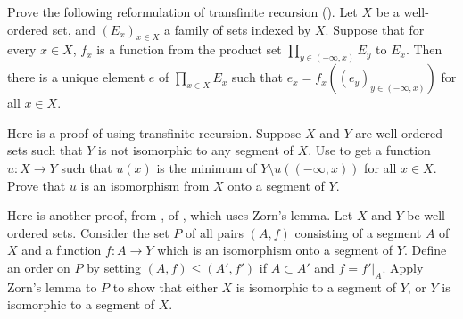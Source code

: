 \documentclass{article}
\begin{document}
\begin{exercise}
  \label{exe:oh59gz4i}
  Prove the following reformulation of transfinite recursion
  ().  Let \(X\) be a well-ordered set, and
  \((E_x)_{x \in X}\) a family of sets indexed by \(X\).  Suppose that
  for every \(x \in X\), \(f_x\) is a function from the product set
  \(\prod_{y \in (-\infty, x)} E_y\) to \(E_x\).  Then there is a
  unique element \(e\) of \(\prod_{x \in X} E_x\) such that
  \(e_x = f_x((e_y)_{y \in (-\infty, x)})\) for all \(x \in X\).
\end{exercise}

\begin{exercise}
  \label{exe:eghnwow2}
  Here is a proof of  using transfinite recursion.
  Suppose \(X\) and \(Y\) are well-ordered sets such that \(Y\) is not
  isomorphic to any segment of \(X\).  Use  to get
  a function \(u : X \to Y\) such that \(u(x)\) is the minimum of
  \(Y \setminus u((-\infty, x))\) for all \(x \in X\).  Prove that
  \(u\) is an isomorphism from \(X\) onto a segment of \(Y\).
\end{exercise}

\begin{exercise}
  \label{exe:vgms7ihx}
  Here is another proof, from \textcite[\S2.5,
  Theorem~3]{bib:lmhdqwpw}, of , which uses Zorn's
  lemma.  Let \(X\) and \(Y\) be well-ordered sets.  Consider the set
  \(P\) of all pairs \((A,f)\) consisting of a segment \(A\) of \(X\)
  and a function \(f : A \to Y\) which is an isomorphism onto a
  segment of \(Y\).  Define an order on \(P\) by setting
  \((A,f) \leq (A',f')\) if \(A \subset A'\) and \(f = f' \vert_A\).
  Apply Zorn's lemma to \(P\) to show that either \(X\) is isomorphic
  to a segment of \(Y\), or \(Y\) is isomorphic to a segment of \(X\).
\end{exercise}
\end{document}

